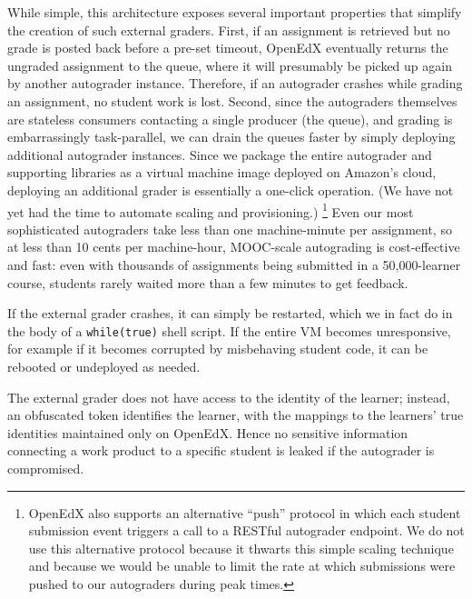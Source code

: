 While simple, this architecture exposes several important properties
that simplify the creation of such external graders.
First, if an assignment is retrieved but no grade is posted back before
a pre-set timeout, OpenEdX eventually returns the ungraded assignment to
the queue, where it will presumably be picked up again by another
autograder instance.
Therefore, if an autograder crashes while grading an assignment, no
student work is lost.
Second, since the autograders themselves are stateless consumers
contacting a single producer (the queue), and grading is
embarrassingly task-parallel, we can drain the queues faster by simply
deploying additional autograder instances.
Since we package the entire autograder and supporting libraries as a
virtual machine image deployed on Amazon's cloud, deploying an
additional grader is essentially a one-click operation. (We have not
yet had the time to automate scaling and provisioning.)
\footnote{OpenEdX also supports an alternative ``push'' protocol in which each student
submission event triggers a call to a RESTful autograder endpoint.
We do not use this
alternative protocol because it thwarts this simple scaling technique
and because we would be  unable to limit the rate at which
submissions were pushed to our autograders during peak times.}
Even our most sophisticated autograders take less than one
machine-minute per assignment, so at less than 10 cents per machine-hour,
MOOC-scale 
autograding is cost-effective and fast: even with
thousands of assignments being submitted in a 50,000-learner course,
students rarely waited more than a few minutes to get feedback.

If the external grader crashes, it can simply be restarted, which we in
fact do in the body of a \texttt{while(true)} shell script.  If the
entire VM becomes unresponsive, for example if it becomes corrupted by
misbehaving student code, it can be rebooted or undeployed as
needed. 

The external grader does not have access to the identity of the learner;
instead, an obfuscated token identifies the learner, with the mappings
to the learners' true identities maintained only on OpenEdX.
Hence no sensitive information connecting a work product to a specific
student is leaked if the autograder is compromised.

